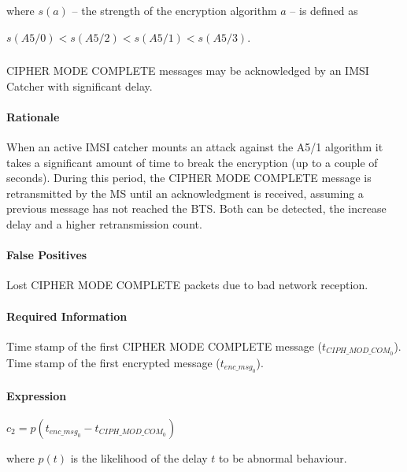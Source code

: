 \documentclass[a4paper,11pt,notitlepage,bigheadings,oneside]{scrartcl}
\begin{document}
where $s(a)$ -- the strength of the encryption algorithm $a$ -- is defined as

$s(A5/0) < s(A5/2) < s(A5/1) < s(A5/3)$.

\subsubsection{}

CIPHER MODE COMPLETE messages may be acknowledged by an IMSI Catcher with
significant delay.

\paragraph{Rationale}

When an active IMSI catcher mounts an attack against the A5/1 algorithm it
takes a significant amount of time to break the encryption (up to a couple of
seconds). During this period, the CIPHER MODE COMPLETE message is retransmitted
by the MS until an acknowledgment is received, assuming a previous message has
not reached the BTS. Both can be detected, the increase delay and a higher
retransmission count.

\paragraph{False Positives}

Lost CIPHER MODE COMPLETE packets due to bad network reception.

\paragraph{Required Information}

Time stamp of the first CIPHER MODE COMPLETE message ($t_{CIPH\_MOD\_COM_0}$).
Time stamp of the first encrypted message ($t_{enc\_msg_0}$).

\paragraph{Expression}

$c_2 = p(t_{enc\_msg_0} - t_{CIPH\_MOD\_COM_0})$

where $p(t)$ is the likelihood of the delay $t$ to be abnormal behaviour.

\end{document}
